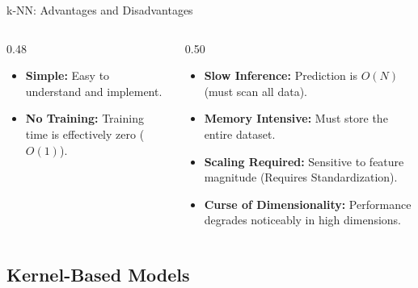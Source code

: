 \begin{frame}{k-NN: Advantages and Disadvantages}
    \begin{columns}[T]
        \begin{column}{0.48\textwidth}
            \begin{tcolorbox}[colback=green!5, title=\textbf{Advantages}]
                \small
                \begin{itemize}
                    \item \textbf{Simple:} Easy to understand and implement.
                    \item \textbf{No Training:} Training time is effectively zero ($O(1)$).
                \end{itemize}
            \end{tcolorbox}
        \end{column}
        \begin{column}{0.50\textwidth}
            \begin{tcolorbox}[colback=red!5, title=\textbf{Disadvantages}]
                \small
                \begin{itemize}
                    \item \textbf{Slow Inference:} Prediction is $O(N)$ (must scan all data).
                    \item \textbf{Memory Intensive:} Must store the entire dataset.
                    \item \textbf{Scaling Required:} Sensitive to feature magnitude (Requires Standardization).
                    \item \textbf{Curse of Dimensionality:} Performance degrades noticeably in high dimensions.
                \end{itemize}
            \end{tcolorbox}
        \end{column}
    \end{columns}
\end{frame}



\subsection{Kernel-Based Models}

